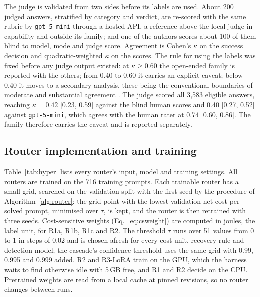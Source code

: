 The judge is validated from two sides before its labels are used. About 200
judged answers, stratified by category and verdict, are re-scored with the
same rubric by \texttt{gpt-5-mini} through a hosted API, a reference above
the local judge in capability and outside its family; and one of the authors
scores about 100 of them blind to model, mode and judge score. Agreement is
Cohen's $\kappa$ \cite{cohen1960kappa} on the success decision and
quadratic-weighted $\kappa$ \cite{cohen1968weighted} on the scores. The rule
for using the labels was fixed before any judge output existed: at
$\kappa \geq 0.60$ the open-ended family is reported with the others; from
0.40 to 0.60 it carries an explicit caveat; below 0.40 it moves to a
secondary analysis, these being the conventional boundaries of moderate and
substantial agreement \cite{landis1977measurement}. The judge scored all
3{,}583 eligible answers, reaching $\kappa = 0.42$ [0.23, 0.59] against the
blind human scores and 0.40 [0.27, 0.52] against \texttt{gpt-5-mini}, which
agrees with the human rater at 0.74 [0.60, 0.86].
The family therefore carries the caveat and is reported separately.

\subsection{Router implementation and training}
\label{sec:setup-routers}

Table~\ref{tab:hyper} lists every router's input, model and training settings.
All routers are trained on the 716 training prompts. Each trainable router
has a small grid, searched on the validation split with the first seed by the
procedure of Algorithm~\ref{alg:router}: the grid point with the lowest
validation net cost per solved prompt, minimised over $\tau$, is kept, and
the router is then retrained with three seeds. Cost-sensitive weights
(Eq.~\ref{eq:csweight}) are computed in joules, the label unit, for R1a, R1b,
R1c and R2. The threshold $\tau$ runs over 51 values from 0 to 1 in steps of
0.02 and is chosen afresh for every cost unit, recovery rule and detection
model; the cascade's confidence threshold uses the same grid with 0.99,
0.995 and 0.999 added. R2 and R3-LoRA train on the GPU, which the harness
waits to find otherwise idle with 5\,GB free, and R1 and R2 decide on the CPU.
Pretrained weights are read from a local cache at pinned revisions, so no
router changes between runs.

